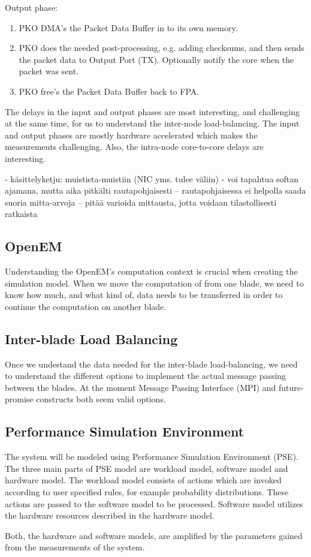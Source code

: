 Output phase:
\begin{enumerate}
\item PKO DMA's the Packet Data Buffer in to its own memory.
\item PKO does the needed post-processing, e.g. adding checksums, and then sends the packet data to Output Port (TX). Optionally notify the core when the packet was sent.
\item PKO free's the Packet Data Buffer back to FPA.
\end{enumerate}

The delays in the input and output phases are most interesting, and challenging at the same time, for us to understand the inter-node load-balancing. The input and output phases are mostly hardware accelerated which makes the measurements challenging. Also, the intra-node core-to-core delays are interesting.

- käsittelyketju: muistista-muistiin (NIC yms. tulee väliin)
- voi tapahtua softan ajamana, mutta aika pitkälti rautapohjaisesti
  -- rautapohjaisessa ei helpolla saada suoria mitta-arvoja
  -- pitää varioida mittausta, jotta voidaan tilastollisesti ratkaista

\subsection{OpenEM}
Understanding the OpenEM's computation context is crucial when creating the simulation model. When we move the computation of from one blade, we need to know how much, and what kind of, data needs to be transferred in order to continue the computation on another blade.

\subsection{Inter-blade Load Balancing}
Once we undestand the data needed for the inter-blade load-balancing, we need to understand the different options to implement the actual message passing between the blades. At the moment Message Passing Interface (MPI) and future-promise constructs both seem valid options.

\subsection{Performance Simulation Environment}
The system will be modeled using Performance Simulation Environment (PSE). The three main parts of PSE  model are workload model, software model and hardware model. The workload model consists of actions which are invoked according to user specified rules, for example probability distributions. These actions are passed to the software model to be processed. Software model utilizes the hardware resources described in the hardware model.

Both, the hardware and software models, are amplified by the parameters gained from the measurements of the system.

